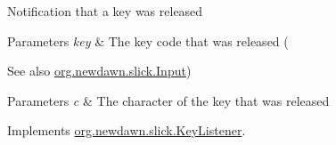 Notification that a key was released


\begin{DoxyParams}{Parameters}
{\em key} & The key code that was released (\\
\hline
\end{DoxyParams}
\begin{DoxySeeAlso}{See also}
\mbox{\hyperlink{classorg_1_1newdawn_1_1slick_1_1_input}{org.\+newdawn.\+slick.\+Input}}) 
\end{DoxySeeAlso}

\begin{DoxyParams}{Parameters}
{\em c} & The character of the key that was released \\
\hline
\end{DoxyParams}


Implements \mbox{\hyperlink{interfaceorg_1_1newdawn_1_1slick_1_1_key_listener_a474673b59bc77266bcef3c261c26ee2b}{org.\+newdawn.\+slick.\+Key\+Listener}}.



